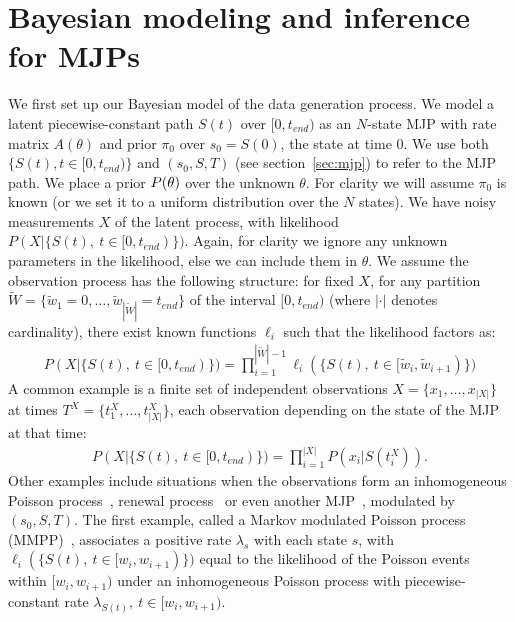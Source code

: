 \section{Bayesian modeling and inference for MJPs}
\label{sec:bayes_model}
We first set up our Bayesian model of the data generation process. 
We model a latent piecewise-constant path $S(t)$ over $[0,t_{end})$ as an $N$-state MJP with rate matrix $A(\theta)$ and prior $\pi_0$ over $s_0 = S(0)$, the state at time $0$. 
We use both $\{S(t), t \in [0,t_{end})\}$ and $(s_0,S,T)$ (see section~\ref{sec:mjp}) to refer to the MJP path.
We place a prior $P(\theta)$ over the unknown $\theta$. 
For clarity we will assume $\pi_0$ is known (or we set it to a uniform distribution over the $N$ states). 
We have noisy measurements $X$ of the latent process, with likelihood $P(X|\{S(t),\ t \in [0,t_{end})\})$.
Again, for clarity we ignore any unknown parameters in the likelihood, else we can include them in $\theta$.
We assume the observation process has the following structure: for fixed $X$, for any partition $\tilde{W} = \{\tilde{w}_1 = 0, \dotsc, \tilde{w}_{|\tilde{W}|}=t_{end}\}$ of the interval $[0,t_{end})$ (where $|\cdot|$ denotes cardinality), there exist known functions $\ell_i$ such that the likelihood factors as:
\begin{align}
  \label{eq:lik_factor}
  P(X|\{S(t),\ t \in [0,t_{end})\}) = \prod_{i=1}^{|\tilde{W}|-1} \ell_i(\{S(t),\ t \in [\tilde{w}_{i},\tilde{w}_{i+1})\})
\end{align}
A common example is a finite set of independent observations $X = \{x_1,\dotsc,x_{|X|}\}$ at times $T^X = \{t^X_1,\dotsc, t^X_{|X|}\}$, each observation depending on the state of the MJP at that time:
\vspace{-.1in}
\begin{align}
  \label{eq:lik_iid}
  P(X|\{S(t),\ t \in [0,t_{end})\}) = \prod_{i=1}^{|X|} P(x_i|S(t^X_i)).
\end{align}
Other examples include situations when the observations form an inhomogeneous Poisson process~\citep{FearnSher2006}, renewal process~\citep{rao2011gaussian} or even another MJP~\citep{Nodelman+al:UAI02,RaoTeh13}, modulated by $(s_0, S, T)$.
The first example, called a Markov modulated Poisson process (MMPP)~\citep{scottmmpp03}, associates a positive rate $\lambda_s$ with each state $s$, with $\ell_i(\{S(t),\ t \in [w_{i},w_{i+1})\})$ equal to the likelihood of the Poisson events within $[w_{i},w_{i+1})$ under an inhomogeneous Poisson process with piecewise-constant rate $\lambda_{S(t)},\ t \in [w_{i},w_{i+1})$.

